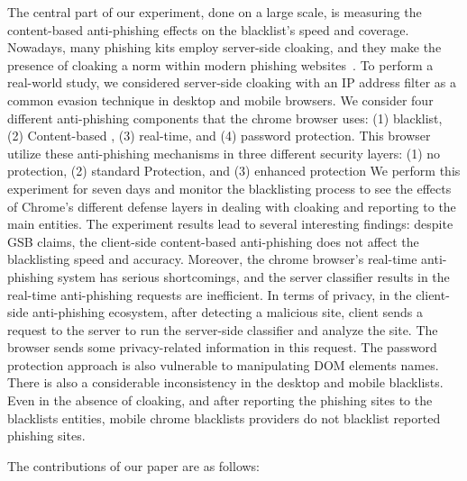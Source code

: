 \documentclass[letterpaper,twocolumn,10pt]{article}
\begin{document}
The central part of our experiment, done on a large scale, is measuring the content-based anti-phishing effects on the blacklist's speed and coverage.
Nowadays, many phishing kits employ server-side cloaking, and they make the presence of cloaking a  norm within modern phishing websites~\cite{oest2018inside}.
To perform a real-world study, we considered server-side cloaking with an IP address filter as a common evasion technique in desktop and mobile browsers.
We consider four different anti-phishing components that the chrome browser uses: (1) blacklist, (2) Content-based , (3) real-time, and (4) password protection. This browser utilize these anti-phishing mechanisms in three different security layers: (1) no protection, (2) standard Protection, and (3) enhanced protection
We perform this experiment for seven days and monitor the blacklisting process to see the effects of Chrome's different defense layers in dealing with cloaking and reporting to the main entities.
The experiment results lead to several interesting findings: 
despite GSB claims, the client-side content-based anti-phishing does not affect the blacklisting speed and accuracy.
Moreover, the chrome browser's real-time anti-phishing system has serious shortcomings, and the server classifier results in the real-time anti-phishing requests are inefficient. 
In terms of privacy, in the client-side anti-phishing ecosystem, after detecting a malicious site, client sends a request to the server to run the server-side classifier and analyze the site. The browser sends some privacy-related information in this request.
The password protection approach is also vulnerable to manipulating DOM elements names. 
There is also a considerable inconsistency in the desktop and mobile blacklists. Even in the absence of cloaking, and after reporting the phishing sites to the blacklists entities, mobile chrome blacklists providers do not blacklist reported phishing sites.

The contributions of our paper are as follows:
\end{document}
